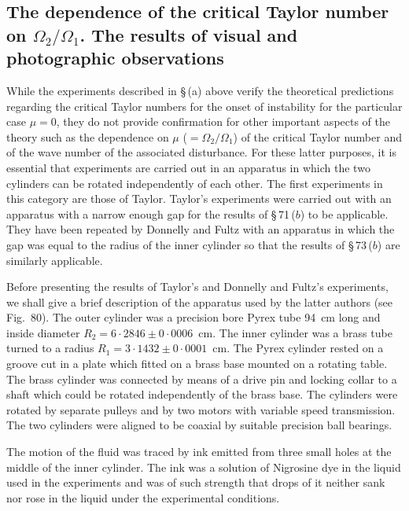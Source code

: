 \subsection{The dependence of the critical Taylor number on $\Omega_2/\Omega_1$. The results of
visual and photographic observations}\label{sec:7-74b}

While the experiments described in \S\,(a) above verify the theoretical
predictions regarding the critical Taylor numbers for the onset of
instability for the particular case $\mu = 0$, they do not provide
confirmation for other important aspects of the theory such as the
dependence on $\mu$ ($= \Omega_2/\Omega_1$) of the critical Taylor number and of the
wave number of the associated disturbance.  For these latter purposes,
it is essential that experiments are carried out in an apparatus in which
the two cylinders can be rotated independently of each other.
The first experiments in this category are those of Taylor.  Taylor's
experiments were carried out with an apparatus with a narrow enough
gap for the results of \S\,71\,($b$) to be applicable.  They have been repeated
by Donnelly and Fultz with an apparatus in which the gap was equal to
the radius of the inner cylinder so that the results of \S\,73\,($b$) are
similarly applicable.

Before presenting the results of Taylor's and Donnelly and Fultz's
experiments, we shall give a brief description of the apparatus used by
the latter authors (see Fig.~80).  The outer cylinder was a precision
bore Pyrex tube 94~cm long and inside diameter $R_2 = 6{\cdot}2846 \pm 0{\cdot}0006$~cm.
The inner cylinder was a brass tube turned to a radius
$R_1 = 3{\cdot}1432 \pm 0{\cdot}0001$~cm.  The Pyrex cylinder rested on a groove cut
in a plate which fitted on a brass base mounted on a rotating table.  The
brass cylinder was connected by means of a drive pin and locking collar
to a shaft which could be rotated independently of the brass base.  The
cylinders were rotated by separate pulleys and by two motors with
variable speed transmission.  The two cylinders were aligned to be coaxial
by suitable precision ball bearings.


The motion of the fluid was traced by ink emitted from three small
holes at the middle of the inner cylinder.  The ink was a solution of
Nigrosine dye in the liquid used in the experiments and was of such
strength that drops of it neither sank nor rose in the liquid under the
experimental conditions.

